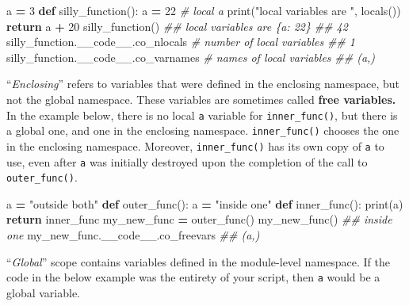 \documentclass[
  12pt,
  krantz2]{krantz}
\makeatletter
\newenvironment{Shaded}{\begin{snugshade}}{\end{snugshade}}
\newcommand{\BuiltInTok}[1]{#1}
\newcommand{\CommentTok}[1]{\textcolor[rgb]{0.37,0.37,0.37}{\textit{#1}}}
\newcommand{\ControlFlowTok}[1]{\textcolor[rgb]{0.27,0.27,0.27}{\textbf{#1}}}
\newcommand{\DecValTok}[1]{\textcolor[rgb]{0.06,0.06,0.06}{#1}}
\newcommand{\KeywordTok}[1]{\textcolor[rgb]{0.27,0.27,0.27}{\textbf{#1}}}
\newcommand{\NormalTok}[1]{#1}
\newcommand{\OperatorTok}[1]{\textcolor[rgb]{0.43,0.43,0.43}{\textbf{#1}}}
\newcommand{\StringTok}[1]{\textcolor[rgb]{0.5,0.5,0.5}{#1}}
\newenvironment{kframe}{%
\medskip{}
\setlength{\fboxsep}{.8em}
 \def\at@end@of@kframe{}%
 \ifinner\ifhmode%
  \def\at@end@of@kframe{\end{minipage}}%
  \begin{minipage}{\columnwidth}%
 \fi\fi%
 \def\FrameCommand##1{\hskip\@totalleftmargin \hskip-\fboxsep
 \colorbox{shadecolor}{##1}\hskip-\fboxsep
     \hskip-\linewidth \hskip-\@totalleftmargin \hskip\columnwidth}%
 \MakeFramed {\advance\hsize-\width
   \@totalleftmargin\z@ \linewidth\hsize
   \@setminipage}}%
 {\par\unskip\endMakeFramed%
 \at@end@of@kframe}
\renewenvironment{Shaded}{\begin{kframe}}{\end{kframe}}
\makeatother
\begin{document}
\begin{Shaded}
\begin{Highlighting}[]
\NormalTok{a }\OperatorTok{=} \DecValTok{3}
\KeywordTok{def}\NormalTok{ silly\_function():}
\NormalTok{  a }\OperatorTok{=} \DecValTok{22} \CommentTok{\# local a}
  \BuiltInTok{print}\NormalTok{(}\StringTok{"local variables are "}\NormalTok{, }\BuiltInTok{locals}\NormalTok{())}
  \ControlFlowTok{return}\NormalTok{ a }\OperatorTok{+} \DecValTok{20}
\NormalTok{silly\_function()}
\CommentTok{\#\# local variables are  \{\textquotesingle{}a\textquotesingle{}: 22\}}
\CommentTok{\#\# 42}
\NormalTok{silly\_function.\_\_code\_\_.co\_nlocals }\CommentTok{\# number of local variables}
\CommentTok{\#\# 1}
\NormalTok{silly\_function.\_\_code\_\_.co\_varnames }\CommentTok{\# names of local variables}
\CommentTok{\#\# (\textquotesingle{}a\textquotesingle{},)}
\end{Highlighting}
\end{Shaded}

``\emph{Enclosing}'' refers to variables that were defined in the enclosing namespace, but not the global namespace. These variables are sometimes called \textbf{free variables.} In the example below, there is no local \texttt{a} variable for \texttt{inner\_func()}, but there is a global one, and one in the enclosing namespace. \texttt{inner\_func()} chooses the one in the enclosing namespace. Moreover, \texttt{inner\_func()} has its own copy of \texttt{a} to use, even after \texttt{a} was initially destroyed upon the completion of the call to \texttt{outer\_func()}.

\begin{Shaded}
\begin{Highlighting}[]
\NormalTok{a }\OperatorTok{=} \StringTok{"outside both"}
\KeywordTok{def}\NormalTok{ outer\_func():}
\NormalTok{  a }\OperatorTok{=} \StringTok{"inside one"}
  \KeywordTok{def}\NormalTok{ inner\_func():}
    \BuiltInTok{print}\NormalTok{(a)}
  \ControlFlowTok{return}\NormalTok{ inner\_func}
\NormalTok{my\_new\_func }\OperatorTok{=}\NormalTok{ outer\_func()}
\NormalTok{my\_new\_func()}
\CommentTok{\#\# inside one}
\NormalTok{my\_new\_func.\_\_code\_\_.co\_freevars}
\CommentTok{\#\# (\textquotesingle{}a\textquotesingle{},)}
\end{Highlighting}
\end{Shaded}

``\emph{Global}'' scope contains variables defined in the module-level namespace. If the code in the below example was the entirety of your script, then \texttt{a} would be a global variable.
\end{document}
